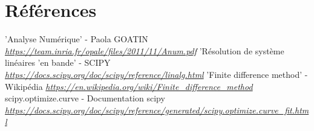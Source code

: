\documentclass[10pt]{article}
\begin{document}
  \section{Références}
  \begin{thebibliography}{}
    
    \label{tridiagonale}
    'Analyse Numérique' - Paola GOATIN\newline
    \href{https://team.inria.fr/opale/files/2011/11/Anum.pdf}
    {\textit{https://team.inria.fr/opale/files/2011/11/Anum.pdf}}
    \newline
    \label{banded}
    'Résolution de système linéaires 'en bande' - SCIPY\newline
    \href{https://docs.scipy.org/doc/scipy/reference/linalg.html}
    {\textit{https://docs.scipy.org/doc/scipy/reference/linalg.html}}
    \newline
    \label{finite}
    'Finite difference method' - Wikipédia\newline
    \href{https://en.wikipedia.org/wiki/Finite\_difference\_method}
    {\textit{https://en.wikipedia.org/wiki/Finite\_difference\_method}}
    \newline
    \label{curve_fit}
    scipy.optimize.curve - Documentation scipy\newline
    \href{https://docs.scipy.org/doc/scipy/reference/generated/scipy.optimize.curve\_fit.html}
    {\textit{https://docs.scipy.org/doc/scipy/reference/generated/scipy.optimize.curve\_fit.html}}
    
    
  \end{thebibliography}
  
\end{document}
